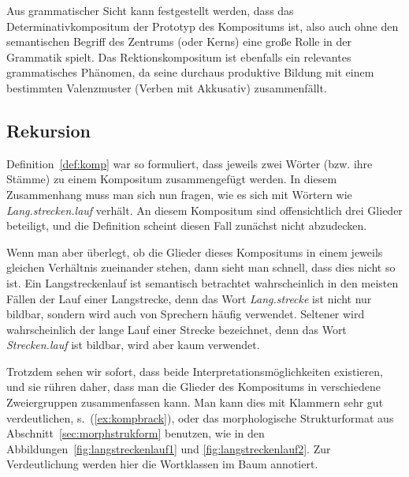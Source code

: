 
Aus grammatischer Sicht kann festgestellt werden, dass das Determinativkompositum der Prototyp des Kompositums ist, also auch ohne den semantischen Begriff des Zentrums (oder Kerns) eine große Rolle in der Grammatik spielt.
Das Rektionskompositum ist ebenfalls ein relevantes grammatisches Phänomen, da seine durchaus produktive Bildung mit einem bestimmten Valenzmuster (Verben mit Akkusativ) zusammenfällt.

\subsection{Rekursion}

\label{sec:rekursion}


Definition~\ref{def:komp} war so formuliert, dass jeweils zwei Wörter (bzw. ihre Stämme) zu einem Kompositum zusammengefügt werden.
In diesem Zusammenhang muss man sich nun fragen, wie es sich mit Wörtern wie \textit{Lang.strecken.lauf} verhält.
An diesem Kompositum sind offensichtlich drei Glieder beteiligt, und die Definition scheint diesen Fall zunächst nicht abzudecken.

Wenn man aber überlegt, ob die Glieder dieses Kompositums in einem jeweils gleichen Verhältnis zueinander stehen, dann sieht man schnell, dass dies nicht so ist.
Ein Langstreckenlauf ist semantisch betrachtet wahrscheinlich in den meisten Fällen der Lauf einer Langstrecke, denn das Wort \textit{Lang.strecke} ist nicht nur bildbar, sondern wird auch von Sprechern häufig verwendet.
Seltener wird wahrscheinlich der lange Lauf einer Strecke bezeichnet, denn das Wort \textit{Strecken.lauf} ist bildbar, wird aber kaum verwendet.

Trotzdem sehen wir sofort, dass beide Interpretationsmöglichkeiten existieren, und sie rühren daher, dass man die Glieder des Kompositums in verschiedene Zweiergruppen zusammenfassen kann.
Man kann dies mit Klammern sehr gut verdeutlichen, s.\ (\ref{ex:kompbrack}), oder das morphologische Strukturformat aus Abschnitt~\ref{sec:morphstrukform} benutzen, wie in den Abbildungen~\ref{fig:langstreckenlauf1} und \ref{fig:langstreckenlauf2}.
Zur Verdeutlichung werden hier die Wortklassen im Baum annotiert.

